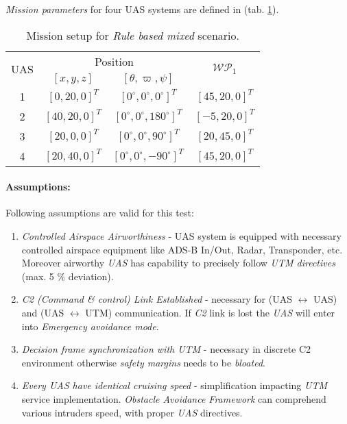     \noindent\emph{Mission parameters} for four UAS systems are defined in (tab. \ref{tab:missionSetupRuleBasedMixedScenario}).
    
    \begin{table}[H]
        \centering
        \begin{tabular}{c||c|c||c}
            \multirow{2}{*}{UAS} &\multicolumn{2}{c||}{Position} & \multirow{2}{*}{$\mathscr{WP}_1$} \\\cline{2-3}
              & $[x,y,z]$           & $[\theta,\varpi,\psi]$           & \\\hline\hline
            1 & $[0,20,0]^T $       & $[0^\circ,0^\circ,0^\circ]^T$    & $[45,20,0]^T$\\\hline 
            2 & $[40,20,0]^T $       & $[0^\circ,0^\circ,180^\circ]^T$    & $[-5,20,0]^T$\\\hline 
            3 & $[20,0,0]^T $       & $[0^\circ,0^\circ,90^\circ]^T$    & $[20,45,0]^T$\\\hline 
            4 & $[20,40,0]^T $       & $[0^\circ,0^\circ,-90^\circ]^T$  & $[45,20,0]^T$\\ 
        \end{tabular}
        \caption{Mission setup for \emph{Rule based mixed} scenario.}
        \label{tab:missionSetupRuleBasedMixedScenario}
    \end{table}

    \paragraph{Assumptions:} Following assumptions are valid for this test:
    
    \begin{enumerate}
        \item \emph{Controlled Airspace Airworthiness} - UAS system is equipped with necessary controlled airspace equipment like ADS-B In/Out, Radar, Transponder, etc. Moreover airworthy \emph{UAS} has capability to precisely follow \emph{UTM directives} (max. 5 $\%$ deviation).
        
        \item \emph{C2 (Command \& control) Link Established} - necessary for (UAS $\leftrightarrow$ UAS) and (UAS $\leftrightarrow$ UTM) communication. If \emph{C2} link is lost the \emph{UAS} will enter into \emph{Emergency avoidance mode}.
        
        \item \emph{Decision frame synchronization with UTM} - necessary in discrete C2 environment otherwise \emph{safety margins} needs to be \emph{bloated}.
        
        \item \emph{Every UAS have identical cruising speed} - simplification impacting \emph{UTM} service implementation. \emph{Obstacle Avoidance Framework} can comprehend various intruders speed, with proper \emph{UAS} directives.
    \end{enumerate}
    
